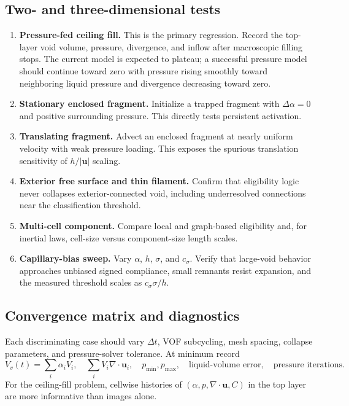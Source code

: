 \documentclass[11pt]{article}
\newcommand{\Dt}{\Delta t}
\newcommand{\divg}{\nabla\!\cdot}
\newcommand{\uv}{\boldsymbol{u}}
\begin{document}
\subsection{Two- and three-dimensional tests}
\begin{enumerate}
  \item \textbf{Pressure-fed ceiling fill.}  This is the primary regression.  Record the
        top-layer void volume, pressure, divergence, and inflow after macroscopic filling
        stops.  The current model is expected to plateau; a successful pressure model
        should continue toward zero with pressure rising smoothly toward neighboring
        liquid pressure and divergence decreasing toward zero.
  \item \textbf{Stationary enclosed fragment.}  Initialize a trapped fragment with
        \(\Delta\alpha=0\) and positive surrounding pressure.  This directly tests
        persistent activation.
  \item \textbf{Translating fragment.}  Advect an enclosed fragment at nearly uniform
        velocity with weak pressure loading.  This exposes the spurious translation
        sensitivity of \(h/|\uv|\) scaling.
  \item \textbf{Exterior free surface and thin filament.}  Confirm that eligibility
        logic never collapses exterior-connected void, including underresolved
        connections near the classification threshold.
  \item \textbf{Multi-cell component.}  Compare local and graph-based eligibility and,
        for inertial laws, cell-size versus component-size length scales.
  \item \textbf{Capillary-bias sweep.}  Vary \(\alpha\), \(h\), \(\sigma\), and
        \(c_\sigma\).  Verify that large-void behavior approaches unbiased signed
        compliance, small remnants resist expansion, and the measured threshold scales
        as \(c_\sigma\sigma/h\).
\end{enumerate}

\subsection{Convergence matrix and diagnostics}

Each discriminating case should vary \(\Dt\), VOF subcycling, mesh spacing, collapse
parameters, and pressure-solver tolerance.  At minimum record
\begin{equation*}
  V_v(t)=\sum_i\alpha_iV_i,\quad
  \sum_i V_i\divg\uv_i,\quad
  p_{\min},p_{\max},\quad
  \text{liquid-volume error},\quad
  \text{pressure iterations}.
\end{equation*}
For the ceiling-fill problem, cellwise histories of \((\alpha,p,\divg\uv,C)\) in the top
layer are more informative than images alone.
\end{document}
